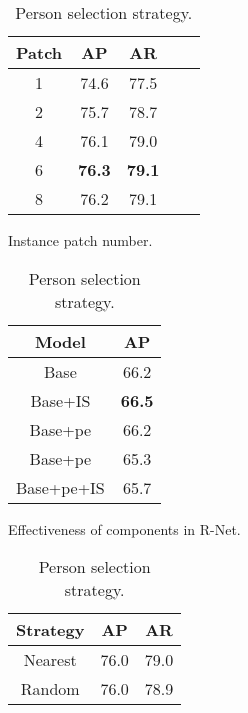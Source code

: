 \documentclass{article}
\begin{document}
\begin{table}[h]
    \small
	\begin{subtable}[h]{0.22\textwidth}
		\centering
        \begin{tabular}{c|cccc}
        \toprule
        Patch & AP            & AR               \\ 
        \midrule
        1     & 74.6          & 77.5             \\
        2     & 75.7          & 78.7             \\
        4     & 76.1          & 79.0             \\
        6     & \textbf{76.3} & \textbf{79.1}    \\
        8     & 76.2          & 79.1             \\ 
        \bottomrule
        \end{tabular}
		\caption{Instance patch number.}
		\label{tab:Ablation_patch_number}
	\end{subtable}
	\hfill
	\begin{subtable}[h]{0.22\textwidth}
		\centering
\begin{tabular}{c|c}
        \toprule
        Model          & AP        \\ 
        \midrule
        Base           & 66.2      \\
        Base+IS        & \textbf{66.5}      \\
        Base+pe        & 66.2      \\
        Base+pe        & 65.3      \\
        Base+pe+IS     & 65.7      \\ 
        \bottomrule
        \end{tabular}
		\caption{Effectiveness of components in R-Net.}
		\label{tab:Ablation_pe_intermediate}
	\end{subtable}
	\hfill
	\begin{subtable}[h]{0.22\textwidth}
		\centering
		\begin{tabular}{c|cc}
        \toprule
        Strategy & AP & AR     \\ 
        \midrule
        Nearest        & 76.0 & 79.0 \\
Random         & 76.0 & 78.9  \\ 
        \bottomrule
        \end{tabular}
		\caption{Person selection strategy.}
		\label{tab:Ablation_patch_strategy}
	\end{subtable}
	\hfill
	\begin{subtable}[h]{0.22\textwidth}

\end{subtable}
\end{table}
\end{document}

